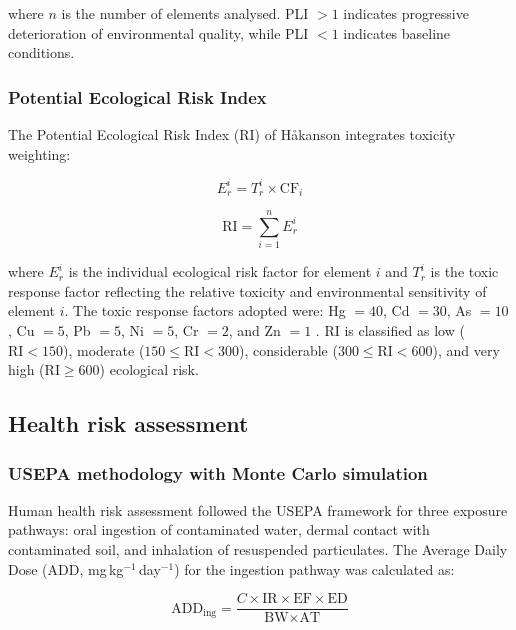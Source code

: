 \documentclass[preprint,12pt,authoryear]{elsarticle}
\begin{document}
\noindent where $n$ is the number of elements analysed. PLI $> 1$ indicates progressive deterioration of environmental quality, while PLI $< 1$ indicates baseline conditions.

\subsubsection{Potential Ecological Risk Index}

The Potential Ecological Risk Index (RI) of H\r{a}kanson \citep{Hakanson1980} integrates toxicity weighting:

\begin{equation}
E_r^i = T_r^i \times \text{CF}_i
\label{eq:er}
\end{equation}

\begin{equation}
\text{RI} = \sum_{i=1}^{n} E_r^i
\label{eq:ri}
\end{equation}

\noindent where $E_r^i$ is the individual ecological risk factor for element $i$ and $T_r^i$ is the toxic response factor reflecting the relative toxicity and environmental sensitivity of element $i$. The toxic response factors adopted were: Hg $= 40$, Cd $= 30$, As $= 10$, Cu $= 5$, Pb $= 5$, Ni $= 5$, Cr $= 2$, and Zn $= 1$ \citep{Hakanson1980}. RI is classified as low ($\text{RI} < 150$), moderate ($150 \leq \text{RI} < 300$), considerable ($300 \leq \text{RI} < 600$), and very high ($\text{RI} \geq 600$) ecological risk.


\subsection{Health risk assessment}

\subsubsection{USEPA methodology with Monte Carlo simulation}

Human health risk assessment followed the USEPA \citep{USEPA2011} framework for three exposure pathways: oral ingestion of contaminated water, dermal contact with contaminated soil, and inhalation of resuspended particulates. The Average Daily Dose (ADD, mg\,kg$^{-1}$\,day$^{-1}$) for the ingestion pathway was calculated as:

\begin{equation}
\text{ADD}_\text{ing} = \frac{C \times \text{IR} \times \text{EF} \times \text{ED}}{\text{BW} \times \text{AT}}
\label{eq:add}
\end{equation}
\end{document}

